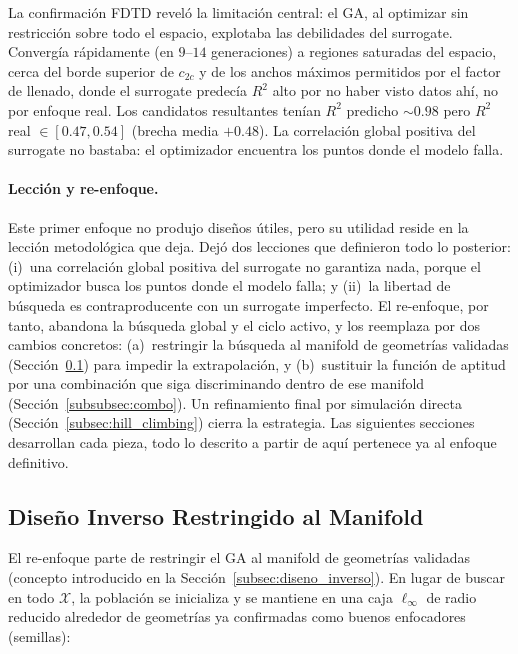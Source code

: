 La confirmación FDTD reveló la limitación central: el GA, al optimizar sin restricción sobre todo el espacio, explotaba las debilidades del surrogate. Convergía rápidamente (en $9$--$14$ generaciones) a regiones saturadas del espacio, cerca del borde superior de $c_{2c}$ y de los anchos máximos permitidos por el factor de llenado, donde el surrogate predecía $R^2$ alto por no haber visto datos ahí, no por enfoque real. Los candidatos resultantes tenían $R^2$ predicho ${\sim}0.98$ pero $R^2$ real $\in [0.47, 0.54]$ (brecha media $+0.48$). La correlación global positiva del surrogate no bastaba: el optimizador encuentra los puntos donde el modelo falla.

\paragraph{Lección y re-enfoque.} Este primer enfoque no produjo diseños útiles, pero su utilidad reside en la lección metodológica que deja. Dejó dos lecciones que definieron todo lo posterior: (i)~una correlación global positiva del surrogate no garantiza nada, porque el optimizador busca los puntos donde el modelo falla; y (ii)~la libertad de búsqueda es contraproducente con un surrogate imperfecto. El re-enfoque, por tanto, abandona la búsqueda global y el ciclo activo, y los reemplaza por dos cambios concretos: (a)~restringir la búsqueda al manifold de geometrías validadas (Sección~\ref{subsec:manifold}) para impedir la extrapolación, y (b)~sustituir la función de aptitud por una combinación que siga discriminando dentro de ese manifold (Sección~\ref{subsubsec:combo}). Un refinamiento final por simulación directa (Sección~\ref{subsec:hill_climbing}) cierra la estrategia. Las siguientes secciones desarrollan cada pieza, todo lo descrito a partir de aquí pertenece ya al enfoque definitivo.

\subsection{Diseño Inverso Restringido al Manifold}\label{subsec:manifold}

El re-enfoque parte de restringir el GA al manifold de geometrías validadas (concepto introducido en la Sección~\ref{subsec:diseno_inverso}). En lugar de buscar en todo $\mathcal{X}$, la población se inicializa y se mantiene en una caja $\ell_\infty$ de radio reducido alrededor de geometrías ya confirmadas como buenos enfocadores (semillas):

